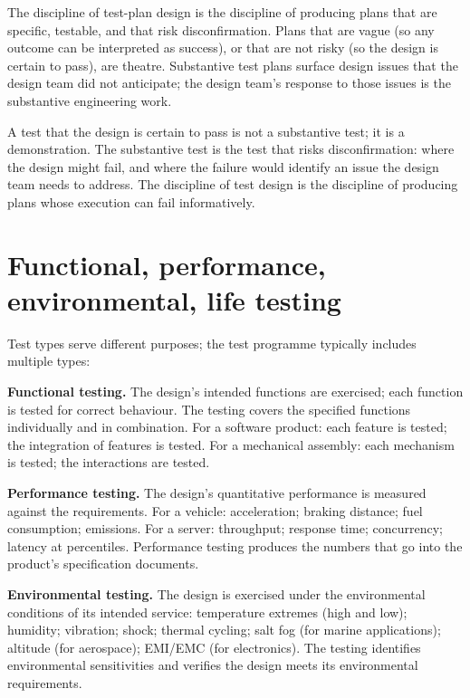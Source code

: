 The discipline of test-plan design is the discipline of producing plans that are specific, testable, and that risk disconfirmation. Plans that are vague (so any outcome can be interpreted as success), or that are not risky (so the design is certain to pass), are theatre. Substantive test plans surface design issues that the design team did not anticipate; the design team's response to those issues is the substantive engineering work.

\begin{principle}
A test that the design is certain to pass is not a substantive test; it is a demonstration. The substantive test is the test that risks disconfirmation: where the design might fail, and where the failure would identify an issue the design team needs to address. The discipline of test design is the discipline of producing plans whose execution can fail informatively.
\end{principle}

\section{Functional, performance, environmental, life testing}

Test types serve different purposes; the test programme typically includes multiple types:

\textbf{Functional testing.} The design's intended functions are exercised; each function is tested for correct behaviour. The testing covers the specified functions individually and in combination. For a software product: each feature is tested; the integration of features is tested. For a mechanical assembly: each mechanism is tested; the interactions are tested.

\textbf{Performance testing.} The design's quantitative performance is measured against the requirements. For a vehicle: acceleration; braking distance; fuel consumption; emissions. For a server: throughput; response time; concurrency; latency at percentiles. Performance testing produces the numbers that go into the product's specification documents.

\textbf{Environmental testing.} The design is exercised under the environmental conditions of its intended service: temperature extremes (high and low); humidity; vibration; shock; thermal cycling; salt fog (for marine applications); altitude (for aerospace); EMI/EMC (for electronics). The testing identifies environmental sensitivities and verifies the design meets its environmental requirements.

